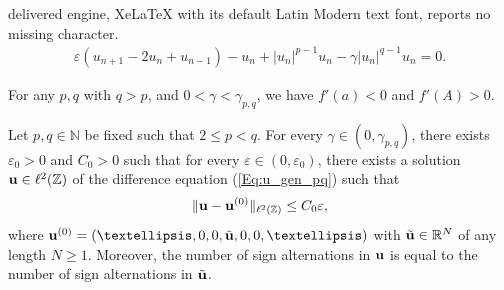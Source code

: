 \documentclass[10pt,a4paper]{amsart}
\begin{document}
delivered engine, XeLaTeX with its default Latin Modern text font, reports no missing character.
\begin{gather}
    \varepsilon\left(u_{n+1}-2u_n+u_{n-1}\right)- u_n+\left|u_n\right|^{p-1} u_n-\gamma\left|u_n\right|^{q-1} u_n=0. 
    \label{Eq:u_gen_pq}
\end{gather}

\begin{lemma}
	\label{lem-1}
	For any $p,q$ with $q>p$, and $0<\gamma<\gamma_{{p,q}}$, we have  $f'(a) < 0$ and $f'(A) > 0$.
\end{lemma}

\begin{prop}
	\label{prop-existence}
	Let $p,q \in \mathbb{N}$ be fixed such that $2 \leq p < q$. 
	For every $\gamma \in (0,\gamma_{{p,q}})$, there exists $\varepsilon_0 > 0$ and $C_0 > 0$ such that for every $\varepsilon \in (0,\varepsilon_0)$, there exists 
	a solution ${\bf u} \in \ell^2(\mathbb{Z})$ of the difference 
	equation (\ref{Eq:u_gen_pq}) such that 
\begin{equation}
\label{bound-u}
	\| {\bf u} - {\bf u}^{(0)} \|_{\ell^2(\mathbb{Z})} \leq C_0 \varepsilon,
\end{equation}
	where ${\bf u}^{(0)} = (\ldots,0,0,\tilde{\bf u},0,0,\ldots)$ with  $\tilde{\bf u} \in \mathbb{R}^N$ of any length $N \geq 1$. Moreover, 
	the number of sign alternations in ${\bf u}$ is equal to the number of sign alternations in $\tilde{\bf u}$.
\end{prop}
\end{document}
